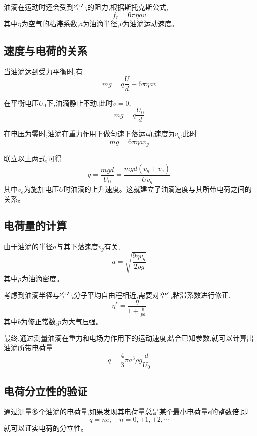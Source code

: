 \documentclass[UTF8]{ctexart}
\begin{document}
油滴在运动时还会受到空气的阻力,根据斯托克斯公式,
\begin{equation}
    f_r = 6\pi \eta av
\end{equation}
其中$\eta$为空气的粘滞系数,$a$为油滴半径,$v$为油滴运动速度。

\subsection{速度与电荷的关系}
当油滴达到受力平衡时,有
\begin{equation}
    mg = q\frac{U}{d} - 6\pi \eta av
\end{equation}

在平衡电压$U_0$下,油滴静止不动,此时$v=0$,
\begin{equation}
    mg = q\frac{U_0}{d}
\end{equation}

在电压为零时,油滴在重力作用下做匀速下落运动,速度为$v_g$,此时
\begin{equation}
    mg = 6\pi \eta av_g
\end{equation}

联立以上两式,可得
\begin{equation}
    q = \frac{mgd}{U_0} = \frac{mgd(v_g+v_e)}{Uv_g}
\end{equation}
其中$v_e$为施加电压$U$时油滴的上升速度。这就建立了油滴速度与其所带电荷之间的关系。

\subsection{电荷量的计算}
由于油滴的半径$a$与其下落速度$v_g$有关,
\begin{equation}
    a = \sqrt{\frac{9\eta v_g}{2\rho g}}
\end{equation}
其中$\rho$为油滴密度。

考虑到油滴半径与空气分子平均自由程相近,需要对空气粘滞系数进行修正,
\begin{equation}
    \eta^* = \frac{\eta}{1+\frac{b}{pa}}
\end{equation}
其中$b$为修正常数,$p$为大气压强。

最终,通过测量油滴在重力和电场力作用下的运动速度,结合已知参数,就可以计算出油滴所带电荷量
\begin{equation}
    q = \frac{4}{3}\pi a^3 \rho g \frac{d}{U_0}
\end{equation}

\subsection{电荷分立性的验证}
通过测量多个油滴的电荷量,如果发现其电荷量总是某个最小电荷量$e$的整数倍,即
\begin{equation}
    q = ne, \quad n=0,\pm1,\pm2,\cdots
\end{equation}
就可以证实电荷的分立性。
\end{document}
